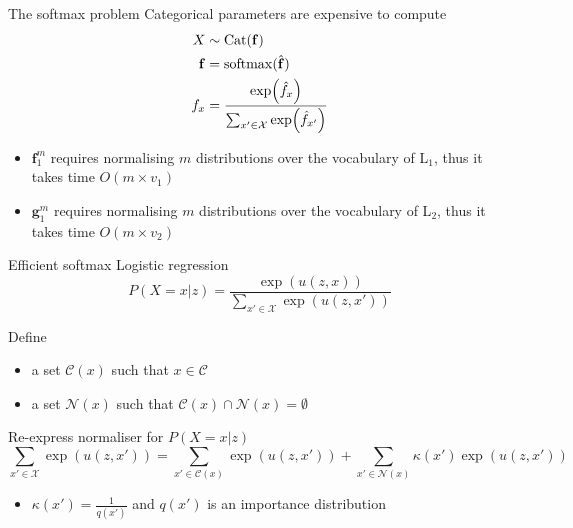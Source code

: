 \begin{frame}{The softmax problem}
Categorical parameters are expensive to compute 
\begin{equation*}
\begin{aligned}
X &\sim \operatorname{Cat}(\mathbf f)\\
\mathbf f &= \operatorname{softmax} (\hat{\mathbf f}) \\
f_{x} &= \frac{\exp(\hat f_x)}{\sum_{x' \in \mathcal X} \exp(\hat f_{x'})}
\end{aligned}
\end{equation*}

\pause

\begin{itemize}
	\item $\mathbf f_1^m$ requires normalising $m$ distributions over the vocabulary of L$_1$, thus it takes time $O(m \times v_1)$
	\item $\mathbf g_1^m$ requires normalising $m$ distributions over the vocabulary of L$_2$, thus it takes time $O(m \times v_2)$
\end{itemize}


\end{frame}

\begin{frame}{Efficient softmax}
Logistic regression
\begin{equation*}
P(X=x|z) = \frac{\exp(u(z, x))}{\sum_{x'\in \mathcal X} \exp(u(z, x'))}
\end{equation*}

\pause

Define
\begin{itemize}
	\item a set $\mathcal C(x)$ such that $x \in \mathcal C$
	\item a set $\mathcal N(x)$ such that $\mathcal C(x) \cap \mathcal N(x) = \emptyset$
\end{itemize}

\pause 
Re-express normaliser for $P(X=x|z)$ 
\begin{equation*}
\sum_{x'\in \mathcal X} \exp(u(z, x')) = \sum_{x'\in \mathcal C(x)} \exp(u(z, x')) + \sum_{x'\in \mathcal N(x)} \kappa(x')\exp(u(z, x'))
\end{equation*}
\begin{itemize}
	\item $\kappa(x') = \frac{1}{q(x')}$ and $q(x')$ is an importance distribution
\end{itemize}

\end{frame}

